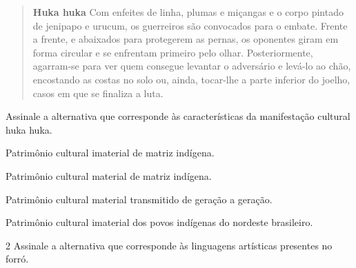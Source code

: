 \begin{quote}
\textbf{Huka huka}
Com enfeites de linha, plumas e miçangas e o corpo pintado de jenipapo e
urucum, os guerreiros são convocados para o embate. Frente a frente, e
abaixados para protegerem as pernas, os oponentes
giram em forma circular e se enfrentam primeiro pelo olhar.
Posteriormente, agarram-se para ver quem consegue levantar o adversário
e levá-lo ao chão, encostando as costas no solo ou, ainda, tocar-lhe a
parte inferior do joelho, casos em que se finaliza a luta.

\end{quote}

Assinale a alternativa que corresponde às características da
manifestação cultural huka huka.

\begin{escolha}
\item
  Patrimônio cultural imaterial de matriz indígena.
\item
  Patrimônio cultural material de matriz indígena.
\item
  Patrimônio cultural material transmitido de geração a geração.
\item
  Patrimônio cultural imaterial dos povos indígenas do nordeste
  brasileiro.
\end{escolha}


\num{2}  Assinale a alternativa que corresponde às linguagens artísticas presentes
no forró.

